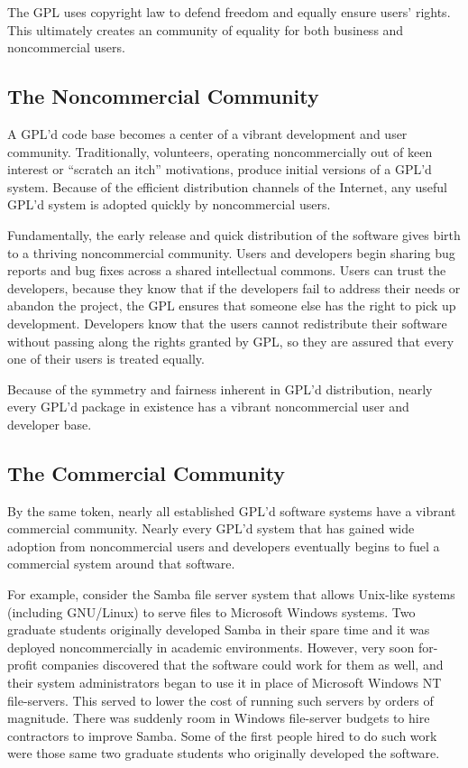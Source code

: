 The GPL uses copyright law to defend freedom and equally ensure users'
rights. This ultimately creates an community of equality for both
business and noncommercial users.

\subsection{The Noncommercial Community}

A GPL'd code base becomes a center of a vibrant development and user
community. Traditionally, volunteers, operating noncommercially out of
keen interest or ``scratch an itch'' motivations, produce initial versions
of a GPL'd system. Because of the efficient distribution channels of the
Internet, any useful GPL'd system is adopted quickly by noncommercial
users.

Fundamentally, the early release and quick distribution of the software
gives birth to a thriving noncommercial community. Users and developers
begin sharing bug reports and bug fixes across a shared intellectual
commons. Users can trust the developers, because they know that if the
developers fail to address their needs or abandon the project, the GPL
ensures that someone else has the right to pick up development.
Developers know that the users cannot redistribute their software without
passing along the rights granted by GPL, so they are assured that every
one of their users is treated equally.

Because of the symmetry and fairness inherent in GPL'd distribution,
nearly every GPL'd package in existence has a vibrant noncommercial user
and developer base.

\subsection{The Commercial Community}

By the same token, nearly all established GPL'd software systems have a
vibrant commercial community. Nearly every GPL'd system that has gained
wide adoption from noncommercial users and developers eventually begins
to fuel a commercial system around that software.

For example, consider the Samba file server system that allows Unix-like
systems (including GNU/Linux) to serve files to Microsoft Windows systems.
Two graduate students originally developed Samba in their spare time and
it was deployed noncommercially in academic environments. However, very
soon for-profit companies discovered that the software could work for them
as well, and their system administrators began to use it in place of
Microsoft Windows NT file-servers. This served to lower the cost of
running such servers by orders of magnitude. There was suddenly room in
Windows file-server budgets to hire contractors to improve Samba. Some of
the first people hired to do such work were those same two graduate
students who originally developed the software.

